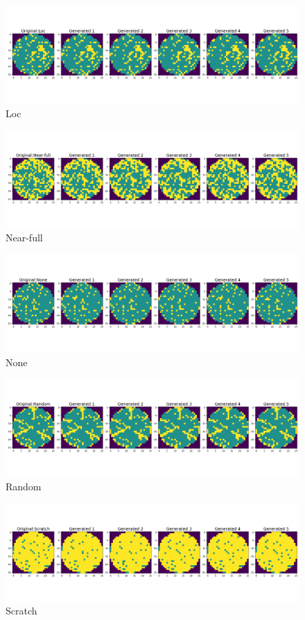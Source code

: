 \documentclass[a4paper, 10]{article}
\begin{document}
    \begin{figure}[H]
        \includegraphics[width=\textwidth]{Loc.png}
        \centering
        \caption{Loc} \label{fig:8}
    \end{figure}
    \begin{figure}[H]
        \includegraphics[width=\textwidth]{Near-full.png}
        \centering
        \caption{Near-full} \label{fig:9}
    \end{figure}
    \begin{figure}[H]
        \includegraphics[width=\textwidth]{None.png}
        \centering
        \caption{None} \label{fig:10}
    \end{figure}
    \begin{figure}[H]
        \includegraphics[width=\textwidth]{Random.png}
        \centering
        \caption{Random} \label{fig:11}
    \end{figure}
    \begin{figure}[H]
        \includegraphics[width=\textwidth]{Scratch.png}
        \centering
        \caption{Scratch} \label{fig:12}
    \end{figure}
\end{document}
